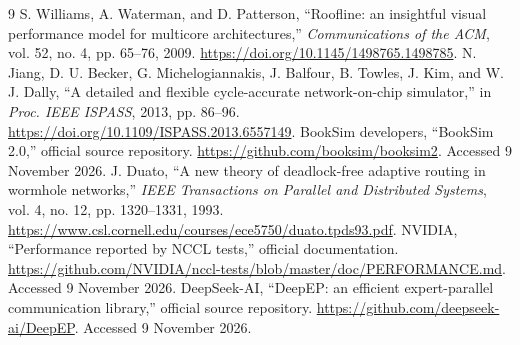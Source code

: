 \documentclass[11pt,a4paper]{article}
\begin{document}
\clearpage
\begin{thebibliography}{9}\small
{}
S. Williams, A. Waterman, and D. Patterson,
``Roofline: an insightful visual performance model for multicore
architectures,'' \emph{Communications of the ACM}, vol. 52, no. 4,
pp. 65--76, 2009. \url{https://doi.org/10.1145/1498765.1498785}.
N. Jiang, D. U. Becker, G. Michelogiannakis, J. Balfour, B. Towles,
J. Kim, and W. J. Dally,
``A detailed and flexible cycle-accurate network-on-chip simulator,''
in \emph{Proc. IEEE ISPASS}, 2013, pp. 86--96.
\url{https://doi.org/10.1109/ISPASS.2013.6557149}.
BookSim developers, ``BookSim 2.0,'' official source repository.
\url{https://github.com/booksim/booksim2}. Accessed 9 November 2026.
J. Duato, ``A new theory of deadlock-free adaptive routing in wormhole
networks,'' \emph{IEEE Transactions on Parallel and Distributed Systems},
vol. 4, no. 12, pp. 1320--1331, 1993.
\url{https://www.csl.cornell.edu/courses/ece5750/duato.tpds93.pdf}.
NVIDIA, ``Performance reported by NCCL tests,'' official documentation.
\url{https://github.com/NVIDIA/nccl-tests/blob/master/doc/PERFORMANCE.md}.
Accessed 9 November 2026.
DeepSeek-AI, ``DeepEP: an efficient expert-parallel communication library,''
official source repository. \url{https://github.com/deepseek-ai/DeepEP}.
Accessed 9 November 2026.
\end{thebibliography}
\end{document}
